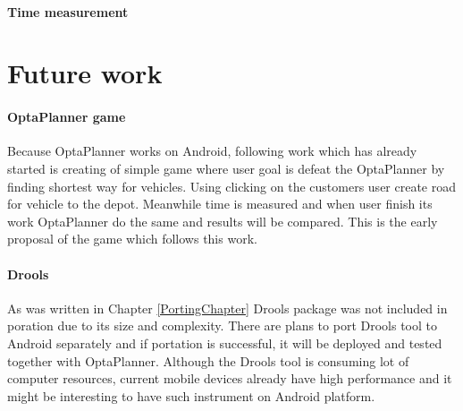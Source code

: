 \paragraph{Time measurement}


\section{Future work}

\paragraph{OptaPlanner game}
Because OptaPlanner works on Android, following work which has already started is creating of simple game where user
goal is defeat the OptaPlanner by finding shortest way for vehicles. Using clicking on the customers user create road
for vehicle to the depot. Meanwhile time is measured and when user finish its work OptaPlanner do the same and results
will be compared. This is the early proposal of the game which follows this work.

\paragraph{Drools}
As was written in Chapter \ref{PortingChapter} Drools package was not included in poration due to its size and
complexity. There are plans to port Drools tool to Android separately and if portation is successful, it will be
deployed and tested together with OptaPlanner. Although the Drools tool is consuming lot of computer resources, current
mobile devices already have high performance and it might be interesting to have such instrument on Android platform.
